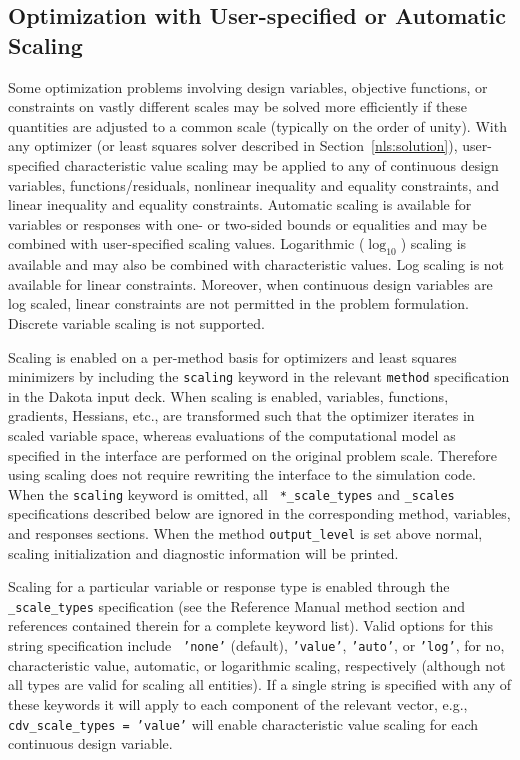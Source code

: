 
\subsection{Optimization with User-specified or Automatic Scaling}\label{opt:additional:scaling}

Some optimization problems involving design variables, objective
functions, or constraints on vastly different scales may be solved
more efficiently if these quantities are adjusted to a common scale
(typically on the order of unity).  With any optimizer (or least
squares solver described in Section~\ref{nls:solution}),
user-specified characteristic value scaling may be applied to any of
continuous design variables, functions/residuals, nonlinear inequality
and equality constraints, and linear inequality and equality
constraints.  Automatic scaling is available for variables or
responses with one- or two-sided bounds or equalities and may be
combined with user-specified scaling values.  Logarithmic
($\log_{10}$) scaling is available and may also be combined with
characteristic values.  Log scaling is not available for linear
constraints.  Moreover, when continuous design variables are log
scaled, linear constraints are not permitted in the problem
formulation.  Discrete variable scaling is not supported.

Scaling is enabled on a per-method basis for optimizers and least
squares minimizers by including the {\tt scaling} keyword in the
relevant {\tt method} specification in the Dakota input deck.  When
scaling is enabled, variables, functions, gradients, Hessians, etc.,
are transformed such that the optimizer iterates in scaled variable
space, whereas evaluations of the computational model as specified in
the interface are performed on the original problem scale.  Therefore
using scaling does not require rewriting the interface to the
simulation code.  When the {\tt scaling} keyword is omitted, all {\tt
*\_scale\_types} and {\tt *\_scales} specifications described below
are ignored in the corresponding method, variables, and responses
sections. When the method {\tt output\_level} is set above normal,
scaling initialization and diagnostic information will be printed.

Scaling for a particular variable or response type is enabled through
the {\tt *\_scale\_types} specification (see the Reference Manual
method section and references contained therein for a complete keyword
list).  Valid options for this string specification include {\tt
'none'} (default), {\tt 'value'}, {\tt 'auto'}, or {\tt 'log'}, for
no, characteristic value, automatic, or logarithmic scaling,
respectively (although not all types are valid for scaling all
entities).  If a single string is specified with any of these keywords
it will apply to each component of the relevant vector, e.g., {\tt
cdv\_scale\_types = 'value'} will enable characteristic value scaling
for each continuous design variable.

